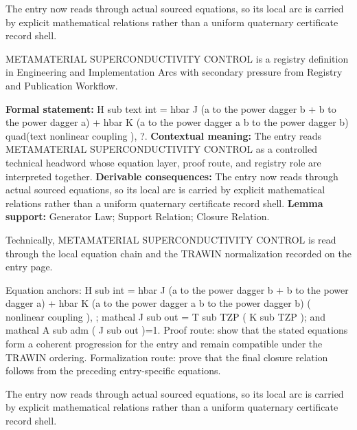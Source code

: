 The entry now reads through actual sourced equations, so its local arc is carried by explicit mathematical relations rather than a uniform quaternary certificate record shell.
\clearpage


\begingroup\small
{}
METAMATERIAL SUPERCONDUCTIVITY CONTROL is a registry definition in Engineering and Implementation Arcs with secondary pressure from Registry and Publication Workflow.

\begingroup\footnotesize\setlength{\emergencystretch}{3em}\sloppy
\textbf{Formal statement:} H sub text int = hbar J (a to the power dagger b + b to the power dagger a) + hbar K (a to the power dagger a b to the power dagger b) quad(text nonlinear coupling ), ?. \textbf{Contextual meaning:} The entry reads METAMATERIAL SUPERCONDUCTIVITY CONTROL as a controlled technical headword whose equation layer, proof route, and registry role are interpreted together. \textbf{Derivable consequences:} The entry now reads through actual sourced equations, so its local arc is carried by explicit mathematical relations rather than a uniform quaternary certificate record shell. \textbf{Lemma support:} Generator Law; Support Relation; Closure Relation.\par
\endgroup

Technically, METAMATERIAL SUPERCONDUCTIVITY CONTROL is read through the local equation chain and the TRAWIN normalization recorded on the entry page.

Equation anchors: H sub int = hbar J (a to the power dagger b + b to the power dagger a) + hbar K (a to the power dagger a b to the power dagger b) ( nonlinear coupling ),  ; mathcal J sub out = T sub TZP ( K sub TZP ); and mathcal A sub adm ( J sub out )=1. Proof route: show that the stated equations form a coherent progression for the entry and remain compatible under the TRAWIN ordering. Formalization route: prove that the final closure relation follows from the preceding entry-specific equations.

The entry now reads through actual sourced equations, so its local arc is carried by explicit mathematical relations rather than a uniform quaternary certificate record shell.
\endgroup

